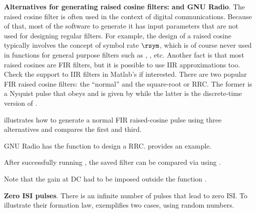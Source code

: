 \bApplication \textbf{Alternatives for generating raised cosine filters: {\matlab} and GNU Radio}.
\label{app:raisedCosinesGeneration}
The raised cosine filter is often used in the context of digital communications. Because of that, most of the software to generate it has input parameters that are not used for designing regular filters. For example, the design of a raised cosine typically involves the concept of symbol rate $\rsym$, which is of course never used in functions for general purpose filters such as , , etc.
Another fact is that most raised cosines are FIR filters, but it is possible to use IIR approximations too. Check the support to IIR filters in Matlab's  if interested. There are two popular FIR raised cosine filters: the ``normal'' and the square-root or RRC. The former is a Nyquist pulse that obeys  and is given by  while the latter is the discrete-time version of .

 illustrates how to generate a normal FIR raised-cosine pulse using three alternatives and compares the first and third.


GNU Radio has the function  to design a RRC.  provides an example.



After successfully running , the saved filter can be compared via {\matlab} using .


Note that the gain at DC had to be imposed outside the function .
\eApplication

\bApplication \textbf{Zero ISI pulses}.
\label{app:zeroISIPulses}
There is an infinite number of pulses that lead to zero ISI. To illustrate their formation law,  exemplifies two cases, using random numbers.


